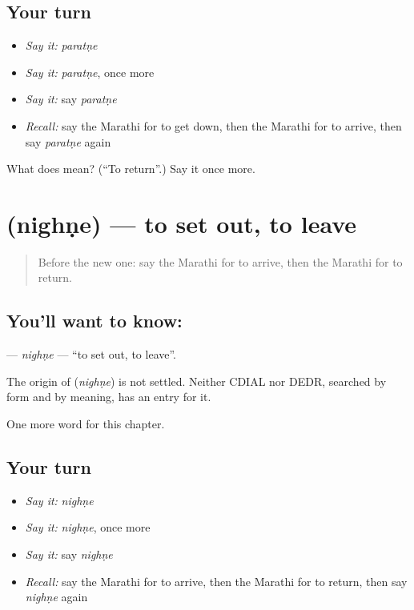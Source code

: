 \subsection*{Your turn}
\begin{itemize}
\raggedright
  \item \emph{Say it:} \emph{paratṇe}
  \item \emph{Say it:} \emph{paratṇe}, once more
  \item \emph{Say it:} say \emph{paratṇe}
  \item \emph{Recall:} say the Marathi for to get down, then the Marathi for to arrive, then say \emph{paratṇe} again
\end{itemize}

\begin{tcolorbox}[breakable,colback=teal!4,colframe=teal!35!black,title={Before you move on}]
What does  mean? (\textquotedblleft{}To return\textquotedblright{}.) Say it once more.
\end{tcolorbox}
\section[\texorpdfstring{\mr{निघणे} (nighṇe)}{निघणे (nighṇe)}]{ (nighṇe) — to set out, to leave}

\label{lesson:MR-C154-nighne}



\begin{quote}
Before the new one: say the Marathi for to arrive, then the Marathi for to return.
\end{quote}

\subsection*{You'll want to know: }
\textbf{} — \emph{nighṇe} — \textquotedblleft{}to set out, to leave\textquotedblright{}.

\begin{cousinweb}
The origin of \textbf{} (\emph{nighṇe}) is not settled. Neither CDIAL nor DEDR, searched by form and by meaning, has an entry for it.
\end{cousinweb}

\begin{grammarlens}[title={What you've built}]
One more word for this chapter.
\end{grammarlens}

\subsection*{Your turn}
\begin{itemize}
\raggedright
  \item \emph{Say it:} \emph{nighṇe}
  \item \emph{Say it:} \emph{nighṇe}, once more
  \item \emph{Say it:} say \emph{nighṇe}
  \item \emph{Recall:} say the Marathi for to arrive, then the Marathi for to return, then say \emph{nighṇe} again
\end{itemize}

